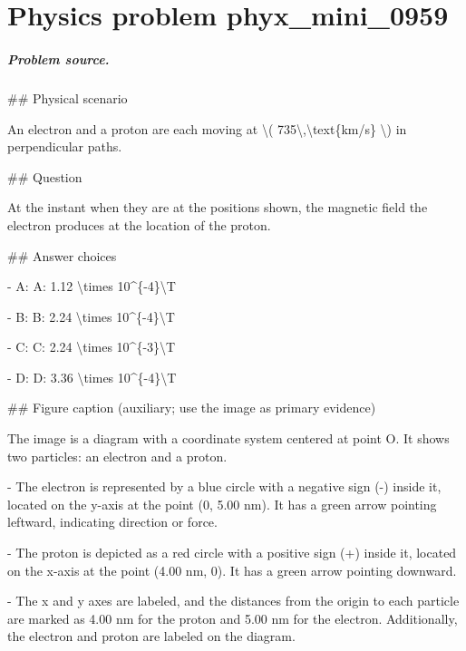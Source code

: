 
\chapter{Physics problem phyx\_mini\_0959}
\label{ch:PhyXMiniProblems_problem_phyx_mini_0959}

\paragraph{Problem source.}
\#\# Physical scenario

An electron and a proton are each moving at \textbackslash{}( 735\textbackslash{},\textbackslash{}text\{km/s\} \textbackslash{}) in perpendicular paths.

\#\# Question

At the instant when they are at the positions shown, the magnetic field the electron produces at the location of the proton.

\#\# Answer choices

- A: A: 1.12 \textbackslash{}times 10\textasciicircum{}\{-4\}\textbackslash{}T

- B: B: 2.24 \textbackslash{}times 10\textasciicircum{}\{-4\}\textbackslash{}T

- C: C: 2.24 \textbackslash{}times 10\textasciicircum{}\{-3\}\textbackslash{}T

- D: D: 3.36 \textbackslash{}times 10\textasciicircum{}\{-4\}\textbackslash{}T

\#\# Figure caption (auxiliary; use the image as primary evidence)

The image is a diagram with a coordinate system centered at point O. It shows two particles: an electron and a proton. 

- The electron is represented by a blue circle with a negative sign (-) inside it, located on the y-axis at the point (0, 5.00 nm). It has a green arrow pointing leftward, indicating direction or force.

- The proton is depicted as a red circle with a positive sign (+) inside it, located on the x-axis at the point (4.00 nm, 0). It has a green arrow pointing downward.

- The x and y axes are labeled, and the distances from the origin to each particle are marked as 4.00 nm for the proton and 5.00 nm for the electron. Additionally, the electron and proton are labeled on the diagram.


